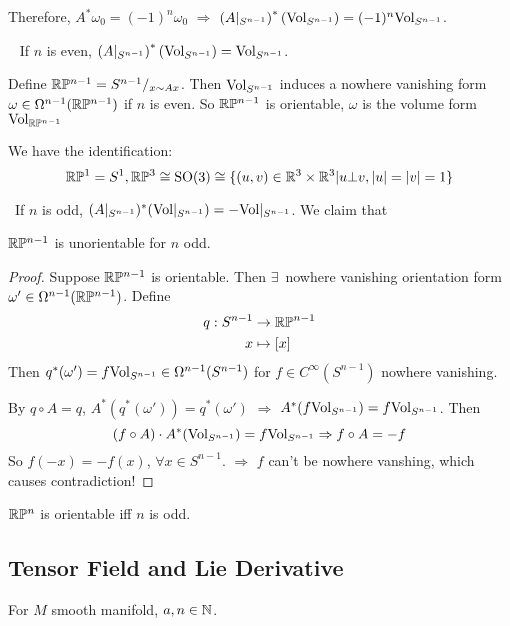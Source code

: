 Therefore,  $ A^*\omega_0=(-1)^{n} \omega_0$ $ \Rightarrow  $  $ \left(A|_{S^{n-1}}\right)^*(\mathrm{Vol}_{S^{n-1}})=(-1)^n\mathrm{Vol}_{S^{n-1}} $. 

\noindent{}\,\,\, If  $ n  $ is even,   $ \left(A|_{S^{n-1}}\right)^*(\mathrm{Vol}_{S^{n-1}})=\mathrm{Vol}_{S^{n-1}} $.

Define  $ \mathbb R\mathbb P^{n-1}=S^{n-1}/_{x\sim Ax} $. Then  $ \mathrm{Vol}_{S^{n-1}} $ induces a nowhere vanishing form  $ \omega\in \Omega^{n-1}(\mathbb R\mathbb P^{n-1}) $ if  $ n $ is even. So  $ \mathbb R\mathbb P^{n-1} $ is orientable,  $ \omega  $ is the volume form $ \mathrm{Vol}_{\mathbb R\mathbb P^{n-1}} $   

\begin{proposition}
    We have the identification: \[\mathbb R\mathbb P^1=S^1,\mathbb R\mathbb P^3\cong \mathrm{SO}(3)\cong\{(u,v)\in\mathbb R^3\times\mathbb R^3|u\bot v,|u|=|v|=1\} \] 
\end{proposition}

\noindent{}\,\,\,If  $ n  $ is odd,  $ (A|_{S^{n-1}})^*(\mathrm{Vol}|_{S^{n-1}})=-\mathrm{Vol}|_{S^{n-1}} $. We claim that 
\begin{proposition}
     $ \mathbb R\mathbb P^{n-1} $ is unorientable for  $ n $ odd.  
\end{proposition} 
\begin{proof}
    Suppose  $ \mathbb R\mathbb P^{n-1} $ is orientable. Then  $ \exists  $\, nowhere vanishing orientation form  $ \omega'\in\Omega^{n-1}(\mathbb R\mathbb P^{n-1}) $. Define 
    \begin{align*}
        q:S^{n-1}&\rightarrow\mathbb R\mathbb P^{n-1}\\
        x&\mapsto [x]
    \end{align*}  
    Then  $ q^*(\omega')=f\mathrm{Vol}_{S^{n-1}}\in\Omega^{n-1}(S^{n-1}) $ for  $ f \in C^\infty(S^{n-1}) $ nowhere vanishing.

    By  $ q\circ A=q $,  $ A^*(q^*(\omega'))=q^*(\omega') $ $ \Rightarrow $ $ A^*(f\mathrm{Vol}_{S^{n-1}})=f\mathrm{Vol}_{S^{n-1}} $. Then 
    \begin{equation}
        (f\circ A)\cdot A^*(\mathrm{Vol}_{S^{n-1}})=f\mathrm{Vol}_{S^{n-1}}\Rightarrow f\circ A=-f
    \end{equation}  
    So  $ f(-x)=-f(x) $, $ \forall x\in S^{n-1} $. $ \Rightarrow  $  $ f  $ can't be nowhere vanshing, which causes contradiction!  
\end{proof}
\begin{theorem}
     $ \mathbb R\mathbb P^{n} $ is orientable iff  $ n  $ is odd. 
\end{theorem}

\subsection{Tensor Field and Lie Derivative}
For  $ M  $ smooth manifold,  $ a,n\in \mathbb N $.


